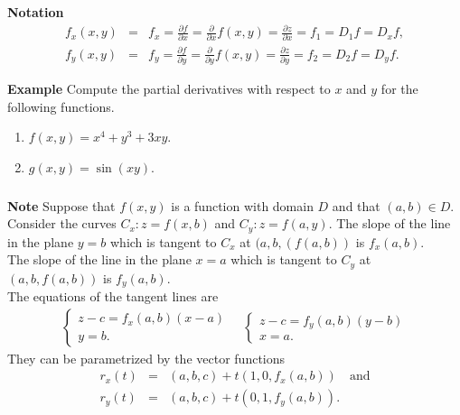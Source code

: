 \begin{frame}[fragile]\frametitle{}
\textbf{Notation}
\begin{eqnarray*}
  f_x(x,y) &=&  f_x = \frac{\partial f}{\partial x} = \frac{\partial}{\partial x} f(x,y) = \frac{\partial z}{\partial x}= f_1 = D_1 f= D_x f, \\
  f_y(x,y) &=&  f_y = \frac{\partial f}{\partial y} = \frac{\partial}{\partial y} f(x,y) = \frac{\partial z}{\partial y}= f_2 = D_2 f= D_y f. 
\end{eqnarray*}
  

\textbf{Example}
 Compute the partial derivatives with respect to $x$ and $y$ for the following functions.
\begin{enumerate}
  \item  $f(x,y) = x^4 + y^3 + 3xy$.
  \item $g(x,y) = \sin(xy)$.
\end{enumerate}

\end{frame}


\begin{frame}[fragile]\frametitle{}
\textbf{Note}
 Suppose that $f(x,y)$ is a function with domain $D$ and that $(a,b)\in D$.  Consider the curves $C_x : z= f(x,b)$  and $C_y : z=f(a,y)$.  The slope of the line in the plane $y=b$ which is tangent to $C_x$ at $(a,b,(f(a,b))$ is $f_x(a,b)$.  \\ 
 The slope of the line in the plane $x=a$ which is tangent to $C_y$ at $(a,b,f(a,b))$ is $f_y(a,b)$.  \\ 
 The equations of the tangent lines are 
 \begin{eqnarray*}
 \begin{cases} z-c= f_x(a,b) (x-a) \\  y=b.\end{cases} \quad \begin{cases} z-c= f_y(a,b)(y-b) \\ x=a. \end{cases}
 \end{eqnarray*}  
 They can be parametrized by the vector functions
   \begin{eqnarray*}
      r_x(t) &=& (a,b,c) + t(1,0,f_x(a,b)) \quad \mbox{and}  \\
      r_y(t) &=& (a,b,c) + t(0,1,f_y(a,b)).
    \end{eqnarray*}
 
\end{frame}


